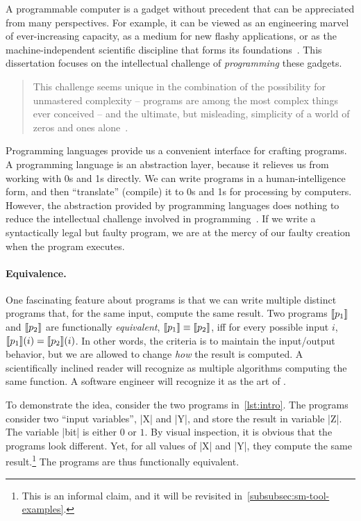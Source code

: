 A programmable computer is a gadget without precedent that can be appreciated
from many perspectives. For example, it can be viewed as an engineering marvel
of ever-increasing capacity, as a medium for new flashy applications, or as the
machine-independent scientific discipline that forms its
foundations~\cite{dijkstra1979a,hoare2006}. This dissertation focuses on the
intellectual challenge of \emph{programming} these gadgets.

\begin{quotation}
\noindent This challenge seems unique in the combination of the possibility for
unmastered complexity -- programs are among the most complex things ever
conceived -- and the ultimate, but misleading, simplicity of a world of zeros
and ones alone~\cite{dijkstra1979a}.
\end{quotation}

Programming languages provide us a convenient interface for crafting programs. A
programming language is an {abstraction layer}, because it relieves us from
working with 0s and 1s directly. We can write programs in a human-intelligence
form, and then \enquote{translate} (compile) it to 0s and 1s for processing by
computers. However, the abstraction provided by programming languages does
nothing to reduce the intellectual challenge involved in
programming~\cite{dijkstra1979b}. If we write a syntactically legal but faulty
program, we are at the mercy of our faulty creation when the program executes.

\paragraph{Equivalence.}
One fascinating feature about programs is that we can write multiple distinct
programs that, for the same input, compute the same result. Two programs
$\llbracket p_1\rrbracket$ and $\llbracket p_2\rrbracket$ are functionally
\emph{equivalent}, \ie \(\llbracket p_1\rrbracket \equiv
\llbracket p_2\rrbracket\), iff for every possible input \(i\), \(\llbracket p_1\rrbracket(i) =
\llbracket p_2\rrbracket(i)\). In other words, the criteria is to maintain the
input/output behavior, but we are allowed to change \emph{how} the result is
computed. A scientifically inclined reader will recognize  as multiple algorithms computing the same function. A software
engineer will recognize it as the art of .

To demonstrate the idea, consider the two programs in~\autoref{lst:intro}. The
programs consider two \enquote{input variables}, \pr|X| and \pr|Y|, and store
the result in variable \pr|Z|. The variable \pr|bit| is either \(0\) or \(1\).
By visual inspection, it is obvious that the programs look different. Yet, for
all values of \pr|X| and \pr|Y|, they compute the same result.\footnote{This is
an informal claim, and it will be revisited
in~\autoref{subsubsec:sm-tool-examples}.} The programs are thus functionally
equivalent.

